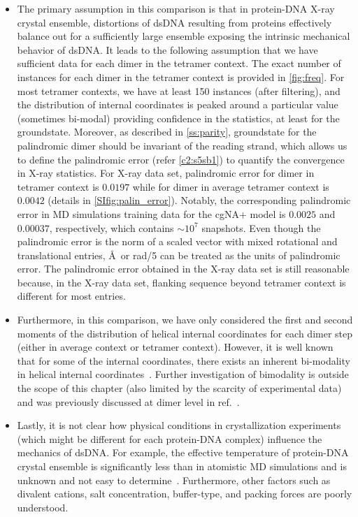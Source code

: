 \begin{itemize}
    \item The primary assumption in this comparison is that in protein-DNA X-ray crystal ensemble, distortions of dsDNA resulting from proteins effectively balance out for a sufficiently large ensemble exposing the intrinsic mechanical behavior of dsDNA. 
It leads to the following assumption that we have sufficient data for each dimer in the tetramer context. 
The exact number of instances for each dimer in the tetramer context is provided in \cref{fig:freq}. 
For most tetramer contexts, we have at least 150 instances (after filtering), and the distribution of internal coordinates is peaked around a particular 
value (sometimes bi-modal) providing confidence in the statistics, at least for the groundstate. 
Moreover, as described in \cref{ss:parity}, groundstate for the palindromic dimer should be invariant of the reading strand, which allows us to define the palindromic error (refer \cref{c2:s5sb1}) to quantify the convergence in X-ray statistics. 
For X-ray data set, palindromic error for dimer in tetramer context is $0.0197$ while for dimer in average tetramer context is $0.0042$ (details in \cref{SIfig:palin_error}).
Notably, the corresponding palindromic error in MD simulations training data for the cgNA$+$ model is $0.0025$ and 
$0.00037$, respectively, which contains $\sim 10^7$ snapshots. 
Even though the palindromic error is the norm of a scaled vector with mixed rotational and translational entries, \AA \ or rad/5 can be treated as the units of palindromic error.
The palindromic error obtained in the X-ray data set is still reasonable because, in the X-ray data set,  flanking sequence beyond
 tetramer context is different for most entries.
\item Furthermore, in this comparison, we have only considered the first and second moments of the distribution of helical internal coordinates for each dimer step (either in average context or tetramer context).
However, it is well known that for some of the internal coordinates, there exists an inherent bi-modality in helical internal 
coordinates~\cite{dans2012exploring}. 
Further investigation of bimodality is outside the scope of this chapter (also limited by the scarcity of experimental data) and was previously discussed at dimer level in ref.~\cite{olson2011working,dans2012exploring}.

\item Lastly, it is not clear how physical conditions in crystallization experiments 
(which might be different for each protein-DNA complex) influence the mechanics of dsDNA. 
For example, the effective temperature of protein-DNA crystal ensemble is significantly less than in
atomistic MD simulations and is unknown and not easy to determine~\cite{lankavs2003dna,becker2006indirect}. Furthermore, other factors such as divalent cations, salt concentration, buffer-type, and packing forces are poorly understood.
\end{itemize}

